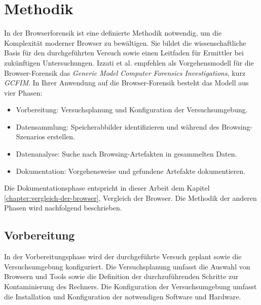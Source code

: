 \chapter{Methodik}
\label{chapter:methodik}
In der Browserforensik ist eine definierte Methodik notwendig, um die Komplexität moderner Browser zu bewältigen. Sie bildet die wissenschaftliche Basis für den durchgeführten Versuch sowie einen Leitfaden für Ermittler bei zukünftigen Untersuchungen. \cite{Aggarwal.2010, Izzati.2022, Horsman.2019}	
Izzati et al. empfehlen als Vorgehensmodell für die Browser-Forensik das \textit{Generic Model Computer Forensics Investigations}, kurz \textit{GCFIM}. \cite{Yusoff.2011}
In Ihrer Anwendung auf die Browser-Forensik besteht das Modell aus vier Phasen: \cite{Izzati.2022}
\begin{itemize}
	\item Vorbereitung: Versuchsplanung und Konfiguration der Versuchsumgebung.
	\item Datensammlung: Speicherabbilder identifizieren und während des Browsing-Szenarios erstellen. 
	\item Datenanalyse: Suche nach Browsing-Artefakten in gesammelten Daten.
	\item Dokumentation: Vorgehensweise und gefundene Artefakte dokumentieren.
\end{itemize}

Die Dokumentationsphase entspricht in dieser Arbeit dem Kapitel \ref{chapter:vergleich-der-browser}, \glqq{}Vergleich der Browser\grqq{}. Die Methodik der anderen Phasen wird nachfolgend beschrieben.

\section{Vorbereitung}
\label{section:methodik-vorbereitung}
In der Vorbereitungsphase wird der durchgeführte Versuch geplant sowie die Versuchsumgebung konfiguriert. \cite{Izzati.2022} Die Versuchsplanung umfasst die Auswahl von Browsern und Tools sowie die Definition der durchzuführenden Schritte zur Kontaminierung des Rechners. Die Konfiguration der Versuchsumgebung umfasst die Installation und Konfiguration der notwendigen Software und Hardware.

